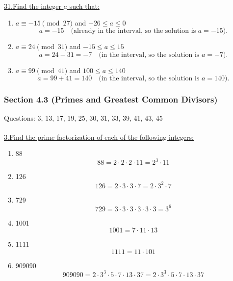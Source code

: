 \documentclass[12pt]{article}
\begin{document}
\vspace{5mm}

\noindent\underline{31.\;Find the integer $a$ such that:}
\begin{enumerate}[label=(\alph*)]
    \item $a \equiv -15 \pmod{27}$ and $-26 \leq a \leq 0$
\[
a = -15 \quad \text{(already in the interval, so the solution is $a=-15$).}
\]

\item $a \equiv 24 \pmod{31}$ and $-15 \leq a \leq 15$
\[
a = 24 - 31 = -7 \quad \text{(in the interval, so the solution is $a=-7$).}
\]

\item $a \equiv 99 \pmod{41}$ and $100 \leq a \leq 140$
\[
a = 99 + 41 = 140 \quad \text{(in the interval, so the solution is $a=140$).}
\]

\end{enumerate}



\newpage
\subsubsection*{Section 4.3 (Primes and Greatest Common Divisors)}
Questions: 3, 13, 17, 19, 25, 30, 31, 33, 39, 41, 43, 45
\\\\

\noindent\underline{3.\;Find the prime factorization of each of the following integers:}
\begin{enumerate}[label=(\alph*)]
    \item 88
    \[
    88 = 2 \cdot 2 \cdot 2 \cdot 11 = 2^3 \cdot 11
    \]
    \item 126
    \[
    126 = 2 \cdot 3 \cdot 3 \cdot 7 = 2 \cdot 3^2 \cdot 7
    \]
    \item 729
    \[
    729 = 3 \cdot 3 \cdot 3 \cdot 3 \cdot 3 \cdot 3 = 3^6
    \]
    \item 1001
    \[
    1001 = 7 \cdot 11 \cdot 13
    \]
    \item 1111
    \[
    1111 = 11 \cdot 101
    \]
    \item 909090
    \[
    909090 = 2 \cdot 3^3 \cdot 5 \cdot 7 \cdot 13 \cdot 37 = 2 \cdot 3^3 \cdot 5 \cdot 7 \cdot 13 \cdot 37
    \]
\end{enumerate}
\end{document}
